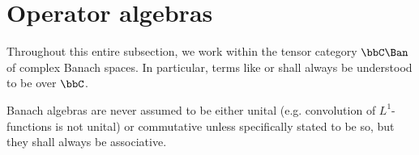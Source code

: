 \section{Operator algebras}
    \begin{convention}
        Throughout this entire subsection, we work within the tensor category $\bbC\Ban$ of complex Banach spaces. In particular, terms like  or  shall always be understood to be over $\bbC$. 
    \end{convention}
    \begin{convention} \label{conv: banach_algebras_are_associative}
        Banach algebras are never assumed to be either unital (e.g. convolution of $L^1$-functions is not unital) or commutative unless specifically stated to be so, but they shall always be associative.
    \end{convention}
    
